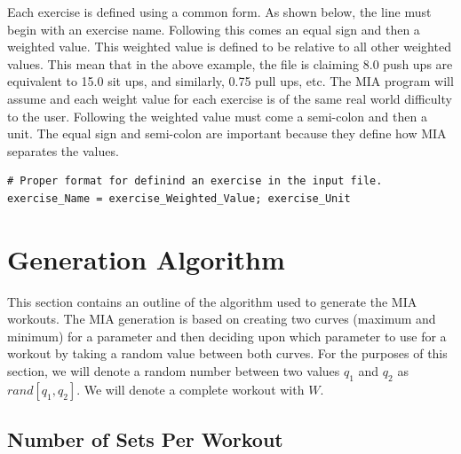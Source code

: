 Each exercise is defined using a common form. As shown below, the line must begin with an exercise name. Following this comes an equal sign and then a weighted value. This weighted value is defined to be relative to all other weighted values. This mean that in the above example, the file is claiming 8.0 push ups are equivalent to 15.0 sit ups, and similarly, 0.75 pull ups, etc. The MIA program will assume and each weight value for each exercise is of the same real world difficulty to the user. Following the weighted value must come a semi-colon and then a unit. The equal sign and semi-colon are important because they define how MIA separates the values. 

\begin{lstlisting}[style=pythonstyle]
# Proper format for definind an exercise in the input file.
exercise_Name = exercise_Weighted_Value; exercise_Unit
\end{lstlisting}


\section{Generation Algorithm}\label{workout algorithm}

This section contains an outline of the algorithm used to generate the MIA workouts. The MIA generation is based on creating two curves (maximum and minimum) for a parameter and then deciding upon which parameter to use for a workout by taking a random value between both curves. For the purposes of this section, we will denote a random number between two values $q_1$ and $q_2$ as $rand[q_1,q_2]$. We will denote a complete workout with $W$.

\subsection{Number of Sets Per Workout}


